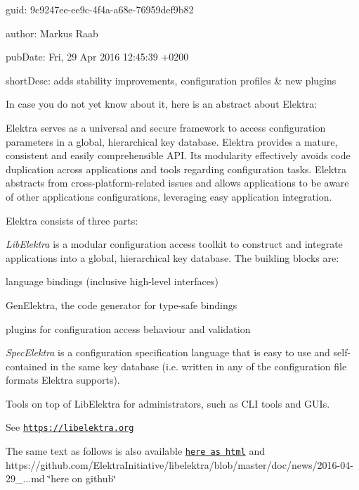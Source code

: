 
\begin{DoxyItemize}
\item guid\+: 9c9247ee-\/ee9c-\/4f4a-\/a68e-\/76959def9b82
\item author\+: Markus Raab
\item pub\+Date\+: Fri, 29 Apr 2016 12\+:45\+:39 +0200
\item short\+Desc\+: adds stability improvements, configuration profiles \& new plugins
\end{DoxyItemize}

In case you do not yet know about it, here is an abstract about Elektra\+:

Elektra serves as a universal and secure framework to access configuration parameters in a global, hierarchical key database. Elektra provides a mature, consistent and easily comprehensible A\+PI. Its modularity effectively avoids code duplication across applications and tools regarding configuration tasks. Elektra abstracts from cross-\/platform-\/related issues and allows applications to be aware of other applications\textquotesingle{} configurations, leveraging easy application integration.

Elektra consists of three parts\+:


\begin{DoxyEnumerate}
\item {\itshape Lib\+Elektra} is a modular configuration access toolkit to construct and integrate applications into a global, hierarchical key database. The building blocks are\+:
\begin{DoxyItemize}
\item language bindings (inclusive high-\/level interfaces)
\item Gen\+Elektra, the code generator for type-\/safe bindings
\item plugins for configuration access behaviour and validation
\end{DoxyItemize}
\item {\itshape Spec\+Elektra} is a configuration specification language that is easy to use and self-\/contained in the same key database (i.\+e. written in any of the configuration file formats Elektra supports).
\item Tools on top of Lib\+Elektra for administrators, such as C\+LI tools and G\+U\+Is.
\end{DoxyEnumerate}

See \href{https://libelektra.org}{\tt https\+://libelektra.\+org}

The same text as follows is also available \href{https://doc.libelektra.org/news/9c9247ee-ee9c-4f4a-a68e-76959def9b82.html}{\tt here as html} and https\+://github.com/\+Elektra\+Initiative/libelektra/blob/master/doc/news/2016-\/04-\/29\+\_...\+md \char`\"{}here on github\char`\"{}


